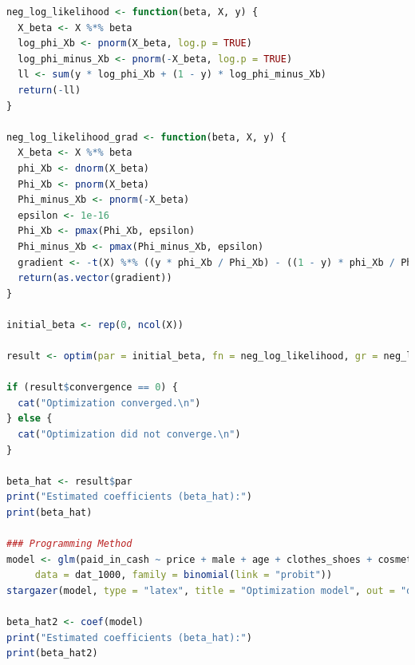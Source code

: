 \documentclass[a4paper,12pt]{article} %
\theoremstyle{nonitalic}
\newenvironment{solution}[1]
  {\renewcommand\theinnercustomsol{#1}\innercustomsol}
  {\endinnercustomsol}
\newcounter{solutionctr}[section]
\renewcommand{\thesolutionctr}{(\alph{solutionctr})}
\newenvironment{autosolution}
  {\stepcounter{solutionctr}\begin{solution}{\thesolutionctr}}
  {\end{solution}}
\begin{document}
\begin{autosolution}
\begin{lstlisting}[language=R]
neg_log_likelihood <- function(beta, X, y) {
  X_beta <- X %*% beta
  log_phi_Xb <- pnorm(X_beta, log.p = TRUE)
  log_phi_minus_Xb <- pnorm(-X_beta, log.p = TRUE)
  ll <- sum(y * log_phi_Xb + (1 - y) * log_phi_minus_Xb)
  return(-ll)
}

neg_log_likelihood_grad <- function(beta, X, y) {
  X_beta <- X %*% beta
  phi_Xb <- dnorm(X_beta)
  Phi_Xb <- pnorm(X_beta)
  Phi_minus_Xb <- pnorm(-X_beta)
  epsilon <- 1e-16
  Phi_Xb <- pmax(Phi_Xb, epsilon)
  Phi_minus_Xb <- pmax(Phi_minus_Xb, epsilon)
  gradient <- -t(X) %*% ((y * phi_Xb / Phi_Xb) - ((1 - y) * phi_Xb / Phi_minus_Xb))
  return(as.vector(gradient))
}

initial_beta <- rep(0, ncol(X))

result <- optim(par = initial_beta, fn = neg_log_likelihood, gr = neg_log_likelihood_grad, X = X, y = y, method = "BFGS")

if (result$convergence == 0) {
  cat("Optimization converged.\n")
} else {
  cat("Optimization did not converge.\n")
}

beta_hat <- result$par
print("Estimated coefficients (beta_hat):")
print(beta_hat)

### Programming Method
model <- glm(paid_in_cash ~ price + male + age + clothes_shoes + cosmetics + food + technology, 
     data = dat_1000, family = binomial(link = "probit"))
stargazer(model, type = "latex", title = "Optimization model", out = "d.tex")

beta_hat2 <- coef(model)
print("Estimated coefficients (beta_hat):")
print(beta_hat2)
    \end{lstlisting}
\end{autosolution}
\end{document}

